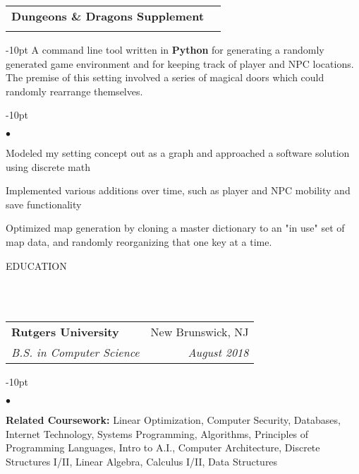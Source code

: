 \documentclass[12pt]{article}
\makeatletter
\newcommand{\header}[1]{
	\vspace*{12pt} %
	{\hspace*{-14pt}\vspace*{6pt} #1}
	\vspace*{-6pt} 
	\lineunder
}
\newcommand{\lineunder}{
	\vspace*{-8pt} \\ 
	\hspace*{-18pt} 
	\hrulefill \\
}
\newcommand{\subheading}[4]{
 	\vspace{5pt}
    	\begin{tabular*}{1.01\textwidth}
    		{l@{\extracolsep{\fill}}r}
      		\hspace{-16pt}\textbf{#1} & #2 \\
      		\hspace{-16pt}\textit{\small#3} & \textit{\small #4} \\
    	\end{tabular*}
    \vspace{-4pt}
}
\newenvironment{achievements}{
\begin{adjustwidth}{-10pt}{}
  \begin{list}{$\bullet$}{
  	\topsep 0pt \itemsep -4pt}}
  	{\vspace*{2pt}\end{list}
\end{adjustwidth}
}
\makeatother
\begin{document}
\subheading{Dungeons \& Dragons Supplement}{}{}{}
	\vspace{-15pt}
	\begin{adjustwidth}{-10pt}{}
	A command line tool written in \textbf{Python} for generating a randomly generated game environment and for keeping track of player and NPC locations. The premise of this setting involved a series of magical doors which could randomly rearrange themselves.
	\end{adjustwidth}
	\begin{achievements}
		\item Modeled my setting concept out as a graph and approached a software solution using discrete math
		\item Implemented various additions over time, such as player and NPC mobility and save functionality
		\item Optimized map generation by cloning a master dictionary to an "in use" set of map data, and randomly reorganizing that one key at a time.
	\end{achievements} 


\header{EDUCATION}

\subheading
	{Rutgers University}{New Brunswick, NJ}
	{B.S. in Computer Science}{August 2018}
	\begin{achievements}	
	\item{\bf Related Coursework:} Linear Optimization, Computer Security, Databases, Internet Technology, Systems Programming, Algorithms, Principles of Programming Languages, Intro to A.I., Computer Architecture, Discrete Structures I/II, Linear Algebra, Calculus I/II, Data Structures
	\end{achievements}



	
\end{document}
